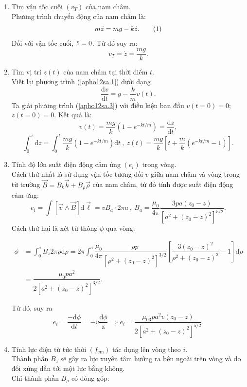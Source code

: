 \begin{loigiai} 
\begin{enumerate}[1)]
    \item Tìm vận tốc cuối $(v_{T})$ của nam châm.\\
Phương trình chuyển động của nam châm là:
\[m\Ddot{z}=mg-k\Dot{z}. \tag{1} \label{apho12sa.1}\]
Đối với vận tốc cuối, $\Ddot{z}=0$. Từ đó suy ra:
\[v_{T}=\Dot{z}=\dfrac{mg}{k}. \tag{2} \label{apho12sa.2}\]
    \item Tìm vị trí $z(t)$ của nam châm tại thời điểm $t$.\\
    Viết lại phương trình (\ref{apho12sa.1}) dưới dạng
    \[\dfrac{\mathrm{d}v}{\mathrm{d}t}=g-\dfrac{k}{m}v(t). \tag{3} \label{apho12sa.3}\]
    Ta giải phương trình (\ref{apho12sa.3}) với điều kiện ban đầu $v(t=0)=0$; $z(t=0)=0$. Kết quả là:
    \[v(t)=\dfrac{mg}{k}(1-e^{-kt/m})=\dfrac{\mathrm{d}z}{\mathrm{d}t}, \tag{4} \label{apho12sa.4}\]
    \[\int_0^z\mathrm{d}z=\int_0^t\dfrac{mg}{k}(1-e^{-kt/m})\mathrm{d}t~,~z(t)=\dfrac{mg}{k}\left[t+\dfrac{m}{k}(e^{-kt/m}-1)\right]. \tag{5} \label{apho12sa.5}\]
    \item Tính độ lớn suất điện động cảm ứng $(e_{i})$ trong vòng.\\
    Cách thứ nhất là sử dụng vận tốc tương đối $v$ giữa nam châm và vòng trong từ trường $\overrightarrow{B}=B_{k}\overrightarrow{k}+B_{\rho}\overrightarrow{\rho}$ của nam châm, từ đó tính được suất điện động cảm ứng:
    \[e_{i}=\int\left[\overrightarrow{v}\wedge\overrightarrow{B}\right]\mathrm{d}\overrightarrow{\ell}=vB_{a}\cdot2\pi a~,~B_{a}=\dfrac{\mu_0}{4\pi}\dfrac{3pa(z_0-z)}{\left[a^2+(z_0-z)^2\right]^{5/2}}. \tag{6} \label{apho12sa.6}\]
    Cách thứ hai là xét từ thông $\phi$ qua vòng: 
    
    \begin{align*}
     \phi&=\int_0^aB_{z}2\pi\rho\mathrm{d}\rho=2\pi\int_0^a\dfrac{\mu_0}{4\pi}\dfrac{\rho p}{[\rho^2+(z_0-z)^2]^{3/2}}\left[\dfrac{3(z_0-z)^2}{\rho^2+(z_0-z)^2}-1\right]\mathrm{d}\rho\\
    &=\dfrac{\mu_0pa^2}{2[a^2+(z_0-z)^2]^{3/2}}. \tag{7} \label{apho12sa.7}
    \end{align*}
    
    Từ đó, suy ra
    \[e_{i}=\dfrac{-\mathrm{d}\phi}{\mathrm{d}t}=-v\dfrac{\mathrm{d}\phi}{\mathrm{z}}~\Rightarrow e_{i}=\dfrac{\mu_03pa^2v(z_0-z)}{2[a^2+(z_0-z)^2]^{5/2}}. \tag{8} \label{apho12sa.8}\]
    \item Tính lực điện từ tức thời $(f_{\text{em}})$ tác dụng lên vòng theo $i$.\\
    Thành phần $B_{z}$ sẽ gây ra lực xuyên tâm hướng ra bên ngoài trên vòng và do đối xứng dẫn tới một lực bằng không.\\
    Chỉ thành phần $B_{\rho}$ có đóng góp:
    

\end{enumerate}
\end{loigiai}
